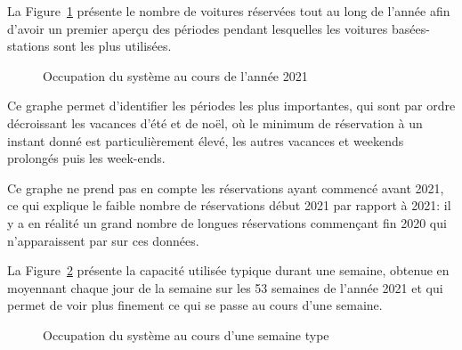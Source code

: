 \documentclass[12pt,a4paper]{article}
\newcommand{\1}[1]{\mathbbm{1}_{\{#1\}} }
\theoremstyle{definition}
\begin{document}
{La Figure~\ref{Année_sbcs} présente le nombre de voitures réservées tout au long de l'année afin d'avoir un premier aperçu des périodes pendant lesquelles les voitures basées-stations sont les plus utilisées. 

\begin{figure}[!h]
\centering
{}
\caption{Occupation du système au cours de l'année 2021}
\label{Année_sbcs}
\end{figure}

Ce graphe permet d'identifier les périodes les plus importantes, qui sont par ordre décroissant les vacances d'été et de noël, où le minimum de réservation à un instant donné est particulièrement élevé, les autres vacances et weekends prolongés puis les week-ends.

Ce graphe ne prend pas en compte les réservations ayant commencé avant 2021, ce qui explique le faible nombre de réservations début 2021 par rapport à 2021: il y a en réalité un grand nombre de longues réservations commençant fin 2020 qui n'apparaissent par sur ces données.


La Figure~\ref{semaine_type} présente la capacité utilisée typique durant une semaine, obtenue en moyennant chaque jour de la semaine sur les 53 semaines de l'année 2021 et qui permet de voir plus finement ce qui se passe au cours d'une semaine.


\begin{figure}[!h]
\centering
{}
\caption{Occupation du système au cours d'une semaine type}
\label{semaine_type}
\end{figure}

}
\end{document}
